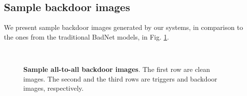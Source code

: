 \documentclass{article}
\begin{document}
\subsection{Sample backdoor images}
We present sample backdoor images generated by our systems, in comparison to the ones from the traditional BadNet models, in Fig. \ref{fig:all2all_sample}.
\begin{figure}[t]
\centering
{}
\hspace{2mm}
\\
\vskip 0.05in

    \vspace{-1mm}
\caption{{\bfseries Sample all-to-all backdoor images}. The first row are clean images. The second and the third rows are triggers and backdoor images, respectively.}
    \vspace{-4mm}
\label{fig:all2all_sample}
\end{figure}
\end{document}
